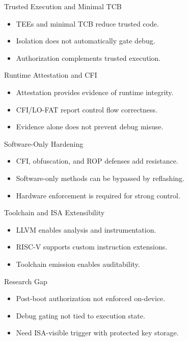 \documentclass[aspectratio=169]{beamer}
\begin{document}
\begin{frame}{Trusted Execution and Minimal TCB}
  \begin{itemize}
    \item TEEs and minimal TCB reduce trusted code.
    \item Isolation does not automatically gate debug.
    \item Authorization complements trusted execution.
  \end{itemize}
\end{frame}

\begin{frame}{Runtime Attestation and CFI}
  \begin{itemize}
    \item Attestation provides evidence of runtime integrity.
    \item CFI/LO-FAT report control flow correctness.
    \item Evidence alone does not prevent debug misuse.
  \end{itemize}
\end{frame}

\begin{frame}{Software-Only Hardening}
  \begin{itemize}
    \item CFI, obfuscation, and ROP defenses add resistance.
    \item Software-only methods can be bypassed by reflashing.
    \item Hardware enforcement is required for strong control.
  \end{itemize}
\end{frame}

\begin{frame}{Toolchain and ISA Extensibility}
  \begin{itemize}
    \item LLVM enables analysis and instrumentation.
    \item RISC-V supports custom instruction extensions.
    \item Toolchain emission enables auditability.
  \end{itemize}
\end{frame}

\begin{frame}{Research Gap}
  \begin{itemize}
    \item Post-boot authorization not enforced on-device.
    \item Debug gating not tied to execution state.
    \item Need ISA-visible trigger with protected key storage.
  \end{itemize}
\end{frame}
\end{document}
